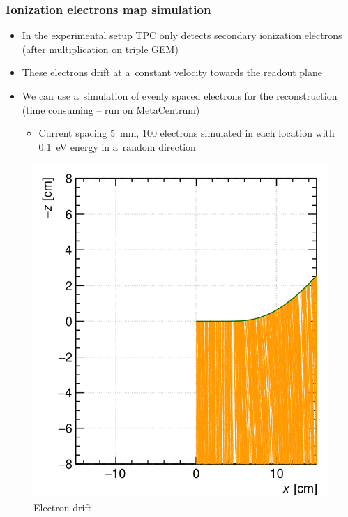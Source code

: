 \documentclass{beamer}
\begin{document}
	\begin{frame}
		\frametitle{Ionization electrons map simulation}
		\begin{itemize}
			\item In the experimental setup TPC only detects secondary ionization electrons (after multiplication on triple GEM)
			\item These electrons drift at a~constant velocity towards the readout plane
			\item We can use a~simulation of evenly spaced electrons for the reconstruction (time consuming -- run on MetaCentrum)
			\begin{itemize}
				\item Current spacing 5~mm, 100 electrons simulated in each location with 0.1~eV energy in a~random direction
			\end{itemize}
		\end{itemize}
		\begin{figure}
			\centering
			\includegraphics[width = 0.3 \linewidth]{../images/track2.png}
			\caption{Electron drift}
		\end{figure}
	\end{frame}
\end{document}
